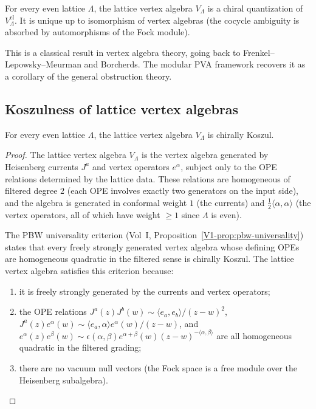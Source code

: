 \begin{theorem}
For every even lattice $\Lambda$, the lattice vertex algebra $V_\Lambda$
is a chiral quantization of $V_\Lambda^{\mathrm{cl}}$. It is unique up to
isomorphism of vertex algebras (the cocycle ambiguity is absorbed by
automorphisms of the Fock module).
\end{theorem}

This is a classical result in vertex algebra theory, going back to
Frenkel--Lepowsky--Meurman and Borcherds. The modular PVA framework
recovers it as a corollary of the general obstruction theory.

\subsection{Koszulness of lattice vertex algebras}

\begin{theorem}
For every even lattice $\Lambda$, the lattice vertex algebra
$V_\Lambda$ is chirally Koszul.
\end{theorem}

\begin{proof}
The lattice vertex algebra $V_\Lambda$ is the vertex algebra generated by
Heisenberg currents $J^a$ and vertex operators $e^\alpha$, subject only to
the OPE relations determined by the lattice data. These relations are
homogeneous of filtered degree $2$ (each OPE involves exactly two generators
on the input side), and the algebra is generated in conformal weight $1$
(the currents) and $\frac{1}{2}\langle\alpha,\alpha\rangle$ (the vertex
operators, all of which have weight $\ge 1$ since $\Lambda$ is even).

The PBW universality criterion
(Vol~I, Proposition~\ref*{V1-prop:pbw-universality})
states that every freely strongly generated vertex algebra whose
defining OPEs are homogeneous quadratic in the filtered sense is
chirally Koszul. The lattice vertex algebra satisfies this criterion
because:
\begin{enumerate}[leftmargin=2.4em]
\item it is freely strongly generated by the currents and vertex operators;
\item the OPE relations $J^a(z) J^b(w) \sim \langle e_a,e_b\rangle/(z-w)^2$,
$J^a(z) e^\alpha(w) \sim \langle e_a,\alpha\rangle e^\alpha(w)/(z-w)$,
and $e^\alpha(z) e^\beta(w) \sim \epsilon(\alpha,\beta)
e^{\alpha+\beta}(w)(z-w)^{-\langle\alpha,\beta\rangle}$
are all homogeneous quadratic in the filtered grading;
\item there are no vacuum null vectors (the Fock space is a free module
over the Heisenberg subalgebra).
\end{enumerate}
\end{proof}

